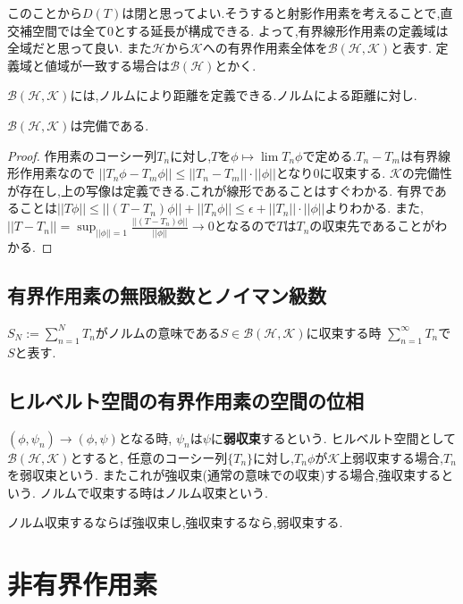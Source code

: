 \documentclass[uplatex]{jsbook}
\begin{document}
このことから$D(T)$は閉と思ってよい.そうすると射影作用素を考えることで,直交補空間では全て0とする延長が構成できる.
よって,有界線形作用素の定義域は全域だと思って良い.
また$\mathcal{H}$から$\mathcal{K}$への有界作用素全体を$\mathcal{B}(\mathcal{H}, \mathcal{K})$と表す.
定義域と値域が一致する場合は$\mathcal{B}(\mathcal{H})$とかく.

$\mathcal{B}(\mathcal{H}, \mathcal{K})$には,ノルムにより距離を定義できる.ノルムによる距離に対し.

\begin{lem}
$\mathcal{B} (\mathcal{H}, \mathcal{K})$は完備である.
\end{lem}
\begin{proof}
作用素のコーシー列$T_n$に対し,$T$を$\phi \mapsto \lim T_n\phi$で定める.$T_n - T_m$は有界線形作用素なので
$||T_n \phi - T_m \phi|| \le ||T_n - T_m|| \cdot ||\phi||$となり$0$に収束する.
$\mathcal{K}$の完備性が存在し,上の写像は定義できる.これが線形であることはすぐわかる.
有界であることは$||T\phi|| \le ||(T - T_n)\phi||+||T_n\phi|| \le  \epsilon + ||T_n|| \cdot || \phi||$よりわかる.
また,$||T - T_n|| = \sup_{||\phi||=1} \frac{||(T - T_n)\phi||}{||\phi||} \to 0$となるので$T$は$T_n$の収束先であることがわかる.
\end{proof}

\subsection{有界作用素の無限級数とノイマン級数}
$S_N := \sum_{n=1}^{N} T_n$がノルムの意味である$S \in \mathcal{B}(\mathcal{H}, \mathcal{K})$に収束する時
$\sum_{n=1}^{\infty}T_n$で$S$と表す.

\subsection{ヒルベルト空間の有界作用素の空間の位相}
$(\phi, \psi_n) \to (\phi, \psi)$となる時, $\psi_n$は$\psi$に\textbf{弱収束}するという.
ヒルベルト空間として$\mathcal{B}(\mathcal{H}, \mathcal{K})$とすると,
任意のコーシー列$\{T_n\}$に対し,$T_n\phi$が$\mathcal{K}$上弱収束する場合,$T_n$を弱収束という.
またこれが強収束(通常の意味での収束)する場合,強収束するという.
ノルムで収束する時はノルム収束という.

ノルム収束するならば強収束し,強収束するなら,弱収束する.

\section{非有界作用素}
\end{document}
